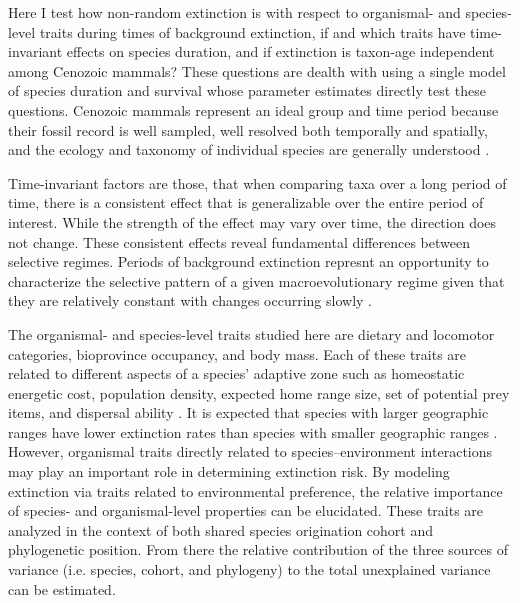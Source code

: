 \documentclass{nature}
\begin{document}
Here I test how non-random extinction is with respect to organismal- and species-level traits during times of background extinction, if and which traits have time-invariant effects on species duration, and if extinction is taxon-age independent among Cenozoic mammals? These questions are dealth with using a single model of species duration and survival whose parameter estimates directly test these questions. 
Cenozoic mammals represent an ideal group and time period because their fossil record is well sampled, well resolved both temporally and spatially, and the ecology and taxonomy of individual species are generally understood \cite{Alroy2009,Liow2008,Smith2004,Quental2013,Simpson1944,Tomiya2013,Marcot2014}. 

Time-invariant factors are those, that when comparing taxa over a long period of time, there is a consistent effect that is generalizable over the entire period of interest. While the strength of the effect may vary over time, the direction does not change. These consistent effects reveal fundamental differences between selective regimes. Periods of background extinction represnt an opportunity to characterize the selective pattern of a given macroevolutionary regime given that they are relatively constant with changes occurring slowly \cite{Jablonski1986,Raup1988}.

The organismal- and species-level traits studied here are dietary and locomotor categories, bioprovince occupancy, and body mass. Each of these traits are related to different aspects of a species' adaptive zone such as homeostatic energetic cost, population density, expected home range size, set of potential prey items, and dispersal ability \cite{Smith2004,Jernvall2004}. It is expected that species with larger geographic ranges have lower extinction rates than species with smaller geographic ranges \cite{Jablonski1986,Roy2009c}. However, organismal traits directly related to species--environment interactions may play an important role in determining extinction risk. By modeling extinction via traits related to environmental preference, the relative importance of species- and organismal-level properties can be elucidated. These traits are analyzed in the context of both shared species origination cohort and phylogenetic position. From there the relative contribution of the three sources of variance (i.e. species, cohort, and phylogeny) to the total unexplained variance can be estimated. 
\end{document}
